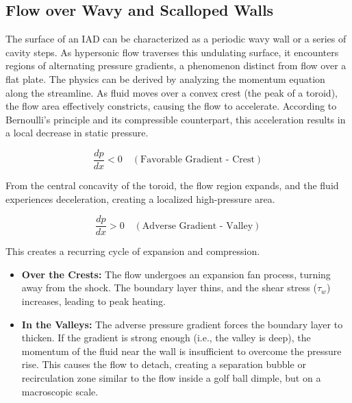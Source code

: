 \subsection{Flow over Wavy and Scalloped Walls}
\par
The surface of an IAD can be characterized as a periodic wavy wall or a series of cavity steps. As hypersonic flow traverses this undulating surface, it encounters regions of alternating pressure gradients, a phenomenon distinct from flow over a flat plate. The physics can be derived by analyzing the momentum equation along the streamline. As fluid moves over a convex crest (the peak of a toroid), the flow area effectively constricts, causing the flow to accelerate. According to Bernoulli's principle and its compressible counterpart, this acceleration results in a local decrease in static pressure.

\begin{equation}
    \frac{dp}{dx} < 0 \quad (\text{Favorable Gradient - Crest})
\end{equation}

From the central concavity of the toroid, the flow region expands, and the fluid experiences deceleration, creating a localized high-pressure area.

\begin{equation}
    \frac{dp}{dx} > 0 \quad (\text{Adverse Gradient - Valley})
\end{equation}

This creates a recurring cycle of expansion and compression.
\begin{itemize}
    \item \textbf{Over the Crests:} The flow undergoes an expansion fan process, turning away from the shock. The boundary layer thins, and the shear stress ($\tau_w$) increases, leading to peak heating.

    \item \textbf{In the Valleys:} The adverse pressure gradient forces the boundary layer to thicken. If the gradient is strong enough (i.e., the valley is deep), the momentum of the fluid near the wall is insufficient to overcome the pressure rise. This causes the flow to detach, creating a separation bubble or recirculation zone similar to the flow inside a golf ball dimple, but on a macroscopic scale.
\end{itemize}

